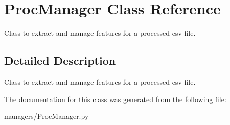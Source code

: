 \hypertarget{class_proc_manager}{}\section{Proc\+Manager Class Reference}
\label{class_proc_manager}


Class to extract and manage features for a processed csv file.  




\subsection{Detailed Description}
Class to extract and manage features for a processed csv file. 



The documentation for this class was generated from the following file\+:\begin{DoxyCompactItemize}
\item 
managers/Proc\+Manager.\+py\end{DoxyCompactItemize}
